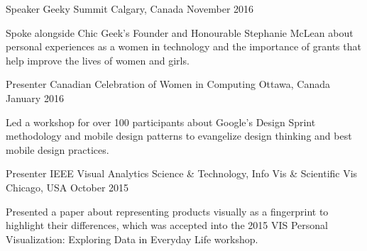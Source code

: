 \begin{cventries}
  \cventry
    {Speaker}
    {Geeky Summit}
    {Calgary, Canada}
    {November 2016}
    {
      \begin{cvitems}
        \item {Spoke alongside Chic Geek's Founder and Honourable Stephanie McLean about personal experiences as a women in technology and the importance of grants that help improve the lives of women and girls.}
      \end{cvitems}
    }
    
    
  \cventry
    {Presenter}
    {Canadian Celebration of Women in Computing}
    {Ottawa, Canada}
    {January 2016}
    {
      \begin{cvitems}
        \item {Led a workshop for over 100 participants about Google's Design Sprint methodology and mobile design patterns to evangelize design thinking and best mobile design practices.}
      \end{cvitems}
    }
    
  \cventry
    {Presenter}
    {IEEE Visual Analytics Science \& Technology, Info Vis \& Scientific Vis}
    {Chicago, USA}
    {October 2015}
    {
      \begin{cvitems}
        \item {Presented a paper about representing products visually as a fingerprint to highlight their differences, which was accepted into the 2015 VIS Personal Visualization: Exploring Data in Everyday Life workshop.}
      \end{cvitems}
    }
    
\end{cventries}
